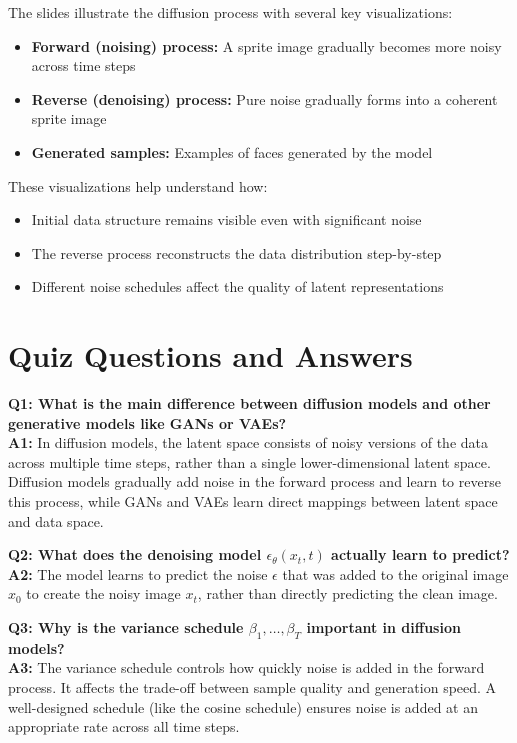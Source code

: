 The slides illustrate the diffusion process with several key visualizations:

\begin{itemize}
    \item \textbf{Forward (noising) process:} A sprite image gradually becomes more noisy across time steps
    \item \textbf{Reverse (denoising) process:} Pure noise gradually forms into a coherent sprite image
    \item \textbf{Generated samples:} Examples of faces generated by the model
\end{itemize}

These visualizations help understand how:
\begin{itemize}
    \item Initial data structure remains visible even with significant noise
    \item The reverse process reconstructs the data distribution step-by-step
    \item Different noise schedules affect the quality of latent representations
\end{itemize}

\section{Quiz Questions and Answers}

\textbf{Q1: What is the main difference between diffusion models and other generative models like GANs or VAEs?}\\
\textbf{A1:} In diffusion models, the latent space consists of noisy versions of the data across multiple time steps, rather than a single lower-dimensional latent space. Diffusion models gradually add noise in the forward process and learn to reverse this process, while GANs and VAEs learn direct mappings between latent space and data space.

\vspace{1em}
\textbf{Q2: What does the denoising model $\epsilon_\theta(x_t, t)$ actually learn to predict?}\\
\textbf{A2:} The model learns to predict the noise $\epsilon$ that was added to the original image $x_0$ to create the noisy image $x_t$, rather than directly predicting the clean image.

\vspace{1em}
\textbf{Q3: Why is the variance schedule $\beta_1, \dots, \beta_T$ important in diffusion models?}\\
\textbf{A3:} The variance schedule controls how quickly noise is added in the forward process. It affects the trade-off between sample quality and generation speed. A well-designed schedule (like the cosine schedule) ensures noise is added at an appropriate rate across all time steps.

